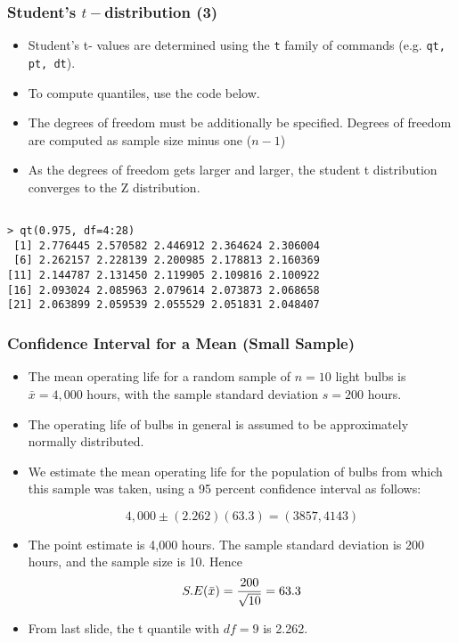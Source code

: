 \documentclass[a4]{beamer}
\begin{document}

\begin{frame}[fragile]
\frametitle{Student's $t-$distribution (3)}

\begin{itemize}
\item Student's t- values are determined using the \texttt{t} family of commands (e.g. \texttt{qt, pt, dt}).
\item To compute quantiles, use the code below.
\item The degrees of freedom must be additionally be specified. Degrees of freedom are computed as sample size minus one ($n-1$)
\item As the degrees of freedom gets larger and larger, the student t distribution converges to the Z distribution.

\end{itemize}
\begin{verbatim}

> qt(0.975, df=4:28)
 [1] 2.776445 2.570582 2.446912 2.364624 2.306004
 [6] 2.262157 2.228139 2.200985 2.178813 2.160369
[11] 2.144787 2.131450 2.119905 2.109816 2.100922
[16] 2.093024 2.085963 2.079614 2.073873 2.068658
[21] 2.063899 2.059539 2.055529 2.051831 2.048407
\end{verbatim}
\end{frame}
\begin{frame}
\frametitle{Confidence Interval for a Mean (Small Sample)}
\begin{itemize}
\item The mean operating life for a random sample of $n = 10$ light bulbs is $\bar{x} = 4,000$ hours, with the sample
standard deviation $s = 200$ hours. \item The operating life of bulbs in general is assumed to be approximately normally distributed.\item
We estimate the mean operating life for the population of bulbs from which this sample was taken, using a 95 percent
confidence interval as follows:

\[4,000\pm(2.262)(63.3)  = (3857,4143)\]

\item The point estimate is 4,000 hours. The sample standard deviation is 200 hours, and the sample size is 10. Hence \[S.E(\bar{x} ) = { 200 \over \sqrt{10}} = 63.3\]

\item From last slide, the t quantile with $df=9$ is 2.262.
\end{itemize}
\end{frame}



\end{document}
